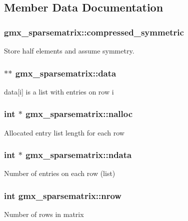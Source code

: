 \subsection{\-Member \-Data \-Documentation}
\hypertarget{structgmx__sparsematrix_a8417fbdb655600b4b781f7093ced07a0}{
\subsubsection[{compressed\-\_\-symmetric}]{ {\bf gmx\-\_\-sparsematrix\-::compressed\-\_\-symmetric}}}\label{structgmx__sparsematrix_a8417fbdb655600b4b781f7093ced07a0}
\-Store half elements and assume symmetry. \hypertarget{structgmx__sparsematrix_abe31d2a420da18631f73fc5e29976250}{
\subsubsection[{data}]{ $\ast$$\ast$ {\bf gmx\-\_\-sparsematrix\-::data}}}\label{structgmx__sparsematrix_abe31d2a420da18631f73fc5e29976250}
data\mbox{[}i\mbox{]} is a list with entries on row i \hypertarget{structgmx__sparsematrix_a872f9f6e085b1431a7cfc54ec8ec97b7}{
\subsubsection[{nalloc}]{\setlength{\rightskip}{0pt plus 5cm}int $\ast$ {\bf gmx\-\_\-sparsematrix\-::nalloc}}}\label{structgmx__sparsematrix_a872f9f6e085b1431a7cfc54ec8ec97b7}
\-Allocated entry list length for each row \hypertarget{structgmx__sparsematrix_ad06fd8f1a38b2b83edeb903dccc65728}{
\subsubsection[{ndata}]{\setlength{\rightskip}{0pt plus 5cm}int $\ast$ {\bf gmx\-\_\-sparsematrix\-::ndata}}}\label{structgmx__sparsematrix_ad06fd8f1a38b2b83edeb903dccc65728}
\-Number of entries on each row (list) \hypertarget{structgmx__sparsematrix_a66c709f29fa9eff4bb76349c3e25fc5e}{
\subsubsection[{nrow}]{\setlength{\rightskip}{0pt plus 5cm}int {\bf gmx\-\_\-sparsematrix\-::nrow}}}\label{structgmx__sparsematrix_a66c709f29fa9eff4bb76349c3e25fc5e}
\-Number of rows in matrix 

